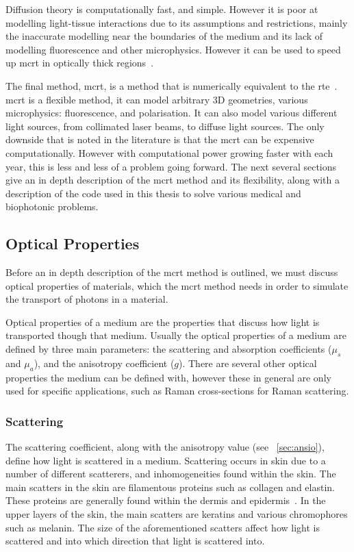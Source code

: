 Diffusion theory is computationally fast, and simple. However it is poor at modelling light-tissue interactions due to its assumptions and restrictions, mainly the inaccurate modelling near the boundaries of the medium and its lack of modelling fluorescence and other microphysics. However it can be used to speed up \gls{mcrt} in optically thick regions~\cite{robitaille2010modified,min2009radiative}.

\medskip

The final method, \gls{mcrt}, is a method that is numerically equivalent to the \gls{rte}~\cite{wang2012biomedical}. \Gls{mcrt} is a flexible method, it can model arbitrary 3D geometries, various microphysics: fluorescence, and polarisation. It can also model various different light sources, from collimated laser beams, to diffuse light sources. The only downside that is noted in the literature is that the \gls{mcrt} can be expensive computationally. However with computational power growing faster with each year, this is less and less of a problem going forward. The next several sections give an in depth description of the \gls{mcrt} method and its flexibility, along with a description of the code used in this thesis to solve various medical and biophotonic problems.

\subsection{Optical Properties}\label{sec:optprop}

Before an in depth description of the \gls{mcrt} method is outlined, we must discuss optical properties of materials, which the \gls{mcrt} method needs in order to simulate the transport of photons in a material.

Optical properties of a medium are the properties that discuss how light is transported though that medium. Usually the optical properties of a medium are defined by three main parameters: the scattering and absorption coefficients ($\mu_s$ and $\mu_a$), and the anisotropy coefficient ($g$). There are several other optical properties the medium can be defined with, however these in general are only used for specific applications, such as Raman cross-sections for Raman scattering.

\subsubsection*{Scattering}\label{sec:scatt}

The scattering coefficient, along with the anisotropy value (see ~\cref{sec:ansio}), define how light is scattered in a medium. Scattering occurs in skin due to a number of different scatterers, and inhomogeneities found within the skin. The main scatters in the skin are filamentous proteins such as collagen and elastin. These proteins are generally found within the dermis and epidermis~\cite{jacques1996origins}. In the upper layers of the skin, the main scatters are keratins and various chromophores such as melanin. 
The size of the aforementioned scatters affect how light is scattered and into which direction that light is scattered into.

